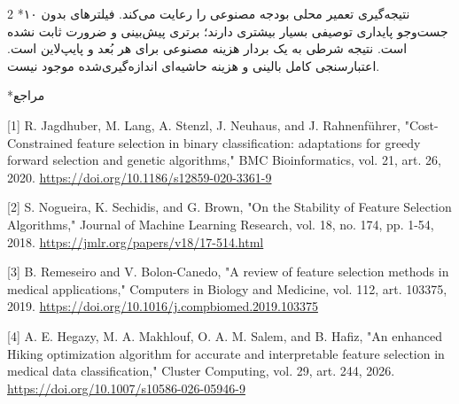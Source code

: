 \documentclass[10pt,a4paper]{article}
\makeatletter
\renewcommand{\section}{\@startsection{section}{1}{0pt}{5pt}{2pt}{\normalfont\normalsize\bfseries}}
\newcommand{\sect}[1]{\section*{#1}}
\makeatother
\begin{document}
\begin{multicols}{2}
\sect{۱۰  نتیجه‌گیری}
تعمیر محلی بودجه مصنوعی را رعایت می‌کند. فیلترهای بدون جست‌وجو پایداری توصیفی بسیار بیشتری دارند؛ برتری پیش‌بینی و ضرورت  ثابت نشده است. نتیجه شرطی به یک بردار هزینه مصنوعی برای هر بُعد و پایپ‌لاین  است. اعتبارسنجی کامل بالینی و هزینه حاشیه‌ای اندازه‌گیری‌شده موجود نیست.

\sect{مراجع}
\begin{minipage}{\linewidth}{\fontsize{7}{8.2}\selectfont \begin{latin}[1] R. Jagdhuber, M. Lang, A. Stenzl, J. Neuhaus, and J. Rahnenführer, "Cost-Constrained feature selection in binary classification: adaptations for greedy forward selection and genetic algorithms," BMC Bioinformatics, vol. 21, art. 26, 2020. \url{https://doi.org/10.1186/s12859-020-3361-9}\end{latin}\par}\end{minipage}\par
\begin{minipage}{\linewidth}{\fontsize{7}{8.2}\selectfont \begin{latin}[2] S. Nogueira, K. Sechidis, and G. Brown, "On the Stability of Feature Selection Algorithms," Journal of Machine Learning Research, vol. 18, no. 174, pp. 1-54, 2018. \url{https://jmlr.org/papers/v18/17-514.html}\end{latin}\par}\end{minipage}\par
\begin{minipage}{\linewidth}{\fontsize{7}{8.2}\selectfont \begin{latin}[3] B. Remeseiro and V. Bolon-Canedo, "A review of feature selection methods in medical applications," Computers in Biology and Medicine, vol. 112, art. 103375, 2019. \url{https://doi.org/10.1016/j.compbiomed.2019.103375}\end{latin}\par}\end{minipage}\par
\begin{minipage}{\linewidth}{\fontsize{7}{8.2}\selectfont \begin{latin}[4] A. E. Hegazy, M. A. Makhlouf, O. A. M. Salem, and B. Hafiz, "An enhanced Hiking optimization algorithm for accurate and interpretable feature selection in medical data classification," Cluster Computing, vol. 29, art. 244, 2026. \url{https://doi.org/10.1007/s10586-026-05946-9}\end{latin}\par}\end{minipage}\par

\end{multicols}
\end{document}
